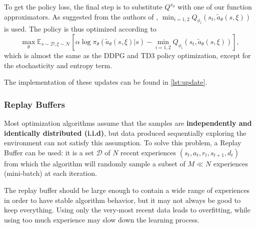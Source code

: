 \documentclass[a4paper, 11pt]{article}
\begin{document}
	To get the policy loss, the final step is to substitute $Q^{\pi_{\theta}}$ with one of our function approximators. As suggested from the authors of \cite{haarnoja2018alg}, $\min_{i=1,2}Q_{\phi_i}(s_t, \tilde{a}_{\theta}(s, \xi))$ is used. The policy is thus optimized according to
					\begin{equation} \label{eq16:policy_opt}
	\max_{\theta} \mathbb{E}_{s \sim \mathcal{D}, \xi \sim \mathcal{N}}[{\alpha \log \pi_{\theta}(\tilde{a}_{\theta}(s,\xi)|s) - \min_{i=1,2}Q_{\phi_i}(s_t, \tilde{a}_{\theta}(s, \xi)) }],
					\end{equation}
	which is almost the same as the DDPG and TD3 policy optimization, except for the stochasticity and entropy term.
	
	
	The implementation of these updates can be found in \vref{lst:update}.
	

	
	
	\subsubsection{Replay Buffers} Most optimization algorithms assume that the samples are \textbf{independently and identically distributed (i.i.d)}, but data produced sequentially exploring the environment can not satisfy this assumption. To solve this problem, a Replay Buffer can be used: it is a set $\mathcal D$ of $N$ recent experiences $(s_t, a_t, r_t, s_{t+1}, d_t)$ from which the algorithm will randomly sample a subset of $M\ll N$ experiences (mini-batch) at each iteration.
	
	The replay buffer should be large enough to contain a wide range of experiences in order to have stable algorithm behavior, but it may not always be good to keep everything. Using only the very-most recent data leads to overfitting, while using too much experience may slow down the learning process.
	
\end{document}
